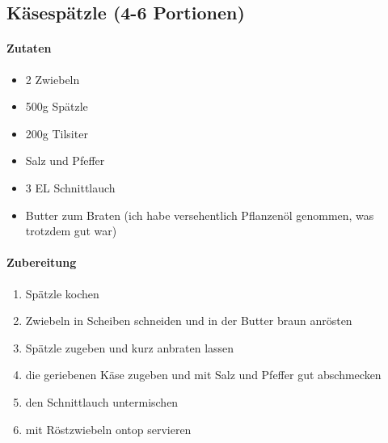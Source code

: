 \newpage
\subsection{Käsespätzle (4-6 Portionen)}
\paragraph{Zutaten}
\begin{itemize}[noitemsep]
	\item 2 Zwiebeln
	\item 500g Spätzle
	\item 200g Tilsiter
	\item Salz und Pfeffer
	\item 3 EL Schnittlauch
	\item Butter zum Braten (ich habe versehentlich Pflanzenöl genommen, was trotzdem gut war)
\end{itemize}
\paragraph{Zubereitung}
\begin{enumerate}[noitemsep]
	\item Spätzle kochen
	\item Zwiebeln in Scheiben schneiden und in der Butter braun anrösten
	\item Spätzle zugeben und kurz anbraten lassen
	\item die geriebenen Käse zugeben und mit Salz und Pfeffer gut abschmecken
	\item den Schnittlauch untermischen
	\item mit Röstzwiebeln ontop servieren
\end{enumerate}
